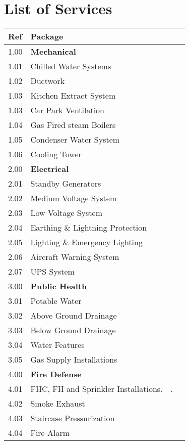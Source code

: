 \section{List of Services}
\label{chap:listofservices}

\begin{longtable}{lll@{}l@{}}
\toprule
Ref	&Package	&	&\\
\midrule
1.00	&\textbf{Mechanical}	&	&\\
1.01	&Chilled Water Systems	&	&\\
1.02	&Ductwork  &		&\\
1.03    &Kitchen Extract System &&\\
1.03	&Car Park Ventilation 	&&\\
1.04	&Gas Fired steam Boilers &&		\\
1.05	&Condenser Water System 	&&     \\
1.06    &Cooling Tower &&  \\
\midrule
2.00	&\textbf{Electrical}		&&\\
2.01	&Standby Generators	&&\\	
2.02	&Medium Voltage System	&&\\	
2.03	&Low Voltage System		&&\\
2.04	&Earthing \& Lightning Protection &&\\		
2.05	&Lighting \& Emergency Lighting  &&\\		
2.06	&Aircraft Warning System &&\\		
2.07	&UPS System	&&\\	
\midrule
3.00	&\textbf{Public Health}		&&\\
3.01	&Potable Water	&&\\	
3.02	&Above Ground Drainage &&\\		
3.03	&Below Ground Drainage  &&\\		
3.04	&Water Features	     &&\\	
3.05	&Gas Supply Installations	&&\\	
\midrule		
4.00	&\textbf{Fire Defense} &&\\	
4.01	&FHC, FH and Sprinkler Installations.	&.&\\	
4.02	&Smoke Exhaust		&&\\
4.03	&Staircase Pressurization          &&\\		
4.04	&Fire Alarm		&&\\

\end{longtable}

